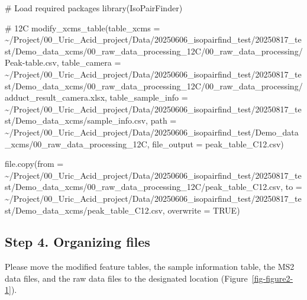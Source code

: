 \documentclass[
  letterpaper,
  DIV=11,
  numbers=noendperiod]{scrreprt}
\newenvironment{Shaded}{\begin{snugshade}}{\end{snugshade}}
\newcommand{\AttributeTok}[1]{\textcolor[rgb]{0.40,0.45,0.13}{#1}}
\newcommand{\CommentTok}[1]{\textcolor[rgb]{0.37,0.37,0.37}{#1}}
\newcommand{\ConstantTok}[1]{\textcolor[rgb]{0.56,0.35,0.01}{#1}}
\newcommand{\FunctionTok}[1]{\textcolor[rgb]{0.28,0.35,0.67}{#1}}
\newcommand{\NormalTok}[1]{\textcolor[rgb]{0.00,0.23,0.31}{#1}}
\newcommand{\StringTok}[1]{\textcolor[rgb]{0.13,0.47,0.30}{#1}}
\begin{document}
\begin{Shaded}
\begin{Highlighting}[]
\CommentTok{\# Load required packages}
\FunctionTok{library}\NormalTok{(IsoPairFinder)}

\CommentTok{\# 12C}
\FunctionTok{modify\_xcms\_table}\NormalTok{(}\AttributeTok{table\_xcms =} \StringTok{\textquotesingle{}\textasciitilde{}/Project/00\_Uric\_Acid\_project/Data/20250606\_isopairfind\_test/20250817\_test/Demo\_data\_xcms/00\_raw\_data\_processing\_12C/00\_raw\_data\_processing/Peak{-}table.csv\textquotesingle{}}\NormalTok{,}
                  \AttributeTok{table\_camera =} \StringTok{\textquotesingle{}\textasciitilde{}/Project/00\_Uric\_Acid\_project/Data/20250606\_isopairfind\_test/20250817\_test/Demo\_data\_xcms/00\_raw\_data\_processing\_12C/00\_raw\_data\_processing/adduct\_result\_camera.xlsx\textquotesingle{}}\NormalTok{,}
                  \AttributeTok{table\_sample\_info =} \StringTok{\textquotesingle{}\textasciitilde{}/Project/00\_Uric\_Acid\_project/Data/20250606\_isopairfind\_test/20250817\_test/Demo\_data\_xcms/sample\_info.csv\textquotesingle{}}\NormalTok{,}
                  \AttributeTok{path =} \StringTok{\textquotesingle{}\textasciitilde{}/Project/00\_Uric\_Acid\_project/Data/20250606\_isopairfind\_test/Demo\_data\_xcms/00\_raw\_data\_processing\_12C\textquotesingle{}}\NormalTok{,}
                  \AttributeTok{file\_output =} \StringTok{\textquotesingle{}peak\_table\_C12.csv\textquotesingle{}}\NormalTok{)}

\FunctionTok{file.copy}\NormalTok{(}\AttributeTok{from =} \StringTok{\textquotesingle{}\textasciitilde{}/Project/00\_Uric\_Acid\_project/Data/20250606\_isopairfind\_test/20250817\_test/Demo\_data\_xcms/00\_raw\_data\_processing\_12C/peak\_table\_C12.csv\textquotesingle{}}\NormalTok{,}
          \AttributeTok{to =} \StringTok{\textquotesingle{}\textasciitilde{}/Project/00\_Uric\_Acid\_project/Data/20250606\_isopairfind\_test/20250817\_test/Demo\_data\_xcms/peak\_table\_C12.csv\textquotesingle{}}\NormalTok{,}
          \AttributeTok{overwrite =} \ConstantTok{TRUE}\NormalTok{)}
\end{Highlighting}
\end{Shaded}

\subsection{Step 4. Organizing files}\label{step-4.-organizing-files}

Please move the modified feature tables, the sample information table,
the MS2 data files, and the raw data files to the designated location
(Figure~\ref{fig-figure2-1}).
\end{document}
